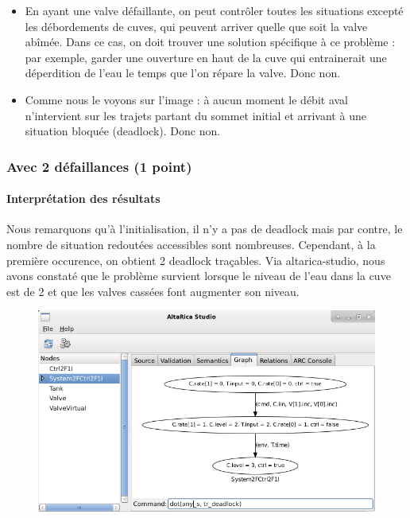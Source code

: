 \documentclass[a4paper]{book}
\begin{document}
\begin{itemize}
	\item En ayant une valve défaillante, on peut contrôler toutes les situations excepté les débordements de cuves, qui peuvent arriver quelle que soit la valve abîmée. Dans ce cas, on doit trouver une solution spécifique à ce problème : par exemple, garder une ouverture en haut de la cuve qui entrainerait une déperdition de l'eau le temps que l'on répare la valve. Donc non.
	\item Comme nous le voyons sur l'image : à aucun moment le débit aval n'intervient sur les trajets partant du sommet initial et arrivant à une situation bloquée (deadlock). Donc non.

\end{itemize}

\subsubsection{Avec 2 défaillances (1 point)}





\paragraph{Interprétation des résultats}

Nous remarquons qu'à l'initialisation, il n'y a pas de deadlock mais par contre, le nombre de situation redoutées accessibles sont nombreuses.
Cependant, à la première occurence, on obtient 2 deadlock traçables. Via altarica-studio, nous avons constaté que le problème survient lorsque le niveau de l'eau dans la cuve est de 2 et que les valves cassées font augmenter son niveau.

\begin{figure}[H]
  \centering
  \includegraphics[width=14cm]{img/CtrlF2I1.png}
\end{figure}
\end{document}
